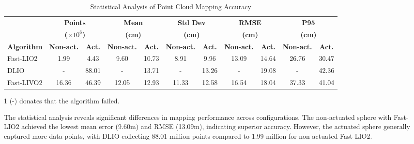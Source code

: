 \documentclass[conference]{IEEEtran}
\begin{document}
\begin{table}
\centering
\begin{threeparttable}
\caption{Statistical Analysis of Point Cloud Mapping Accuracy}
\label{tab:point_cloud_error}
\begin{tabular}{l|cc|cc|cc|cc|cc}
\toprule
& \multicolumn{2}{c|}{\textbf{Points}} & \multicolumn{2}{c|}{\textbf{Mean}} & \multicolumn{2}{c|}{\textbf{Std Dev}} & \multicolumn{2}{c|}{\textbf{RMSE}} & \multicolumn{2}{c}{\textbf{P95}} \\
& \multicolumn{2}{c|}{\textbf{($\times 10^6$)}} & \multicolumn{2}{c|}{\textbf{(cm)}} & \multicolumn{2}{c|}{\textbf{(cm)}} & \multicolumn{2}{c|}{\textbf{(cm)}} & \multicolumn{2}{c}{\textbf{(cm)}} \\
\cmidrule(r){2-3} \cmidrule(lr){4-5} \cmidrule(lr){6-7} \cmidrule(lr){8-9} \cmidrule(l){10-11}
\textbf{Algorithm} & \textbf{Non-act.} & \textbf{Act.} & \textbf{Non-act.} & \textbf{Act.} & \textbf{Non-act.} & \textbf{Act.} & \textbf{Non-act.} & \textbf{Act.} & \textbf{Non-act.} & \textbf{Act.} \\
\midrule
Fast-LIO2 & 1.99 & 4.43 & 9.60 & 10.73 & 8.91 & 9.96 & 13.09 & 14.64 & 26.76 & 30.47 \\
DLIO & - & 88.01 & - & 13.71 & - & 13.26 & - & 19.08 & - & 42.36 \\
Fast-LIVO2 & 16.36 & 46.39 & 12.05 & 12.93 & 11.33 & 12.58 & 16.54 & 18.04 & 37.33 & 41.04 \\
\bottomrule
\end{tabular}
\begin{tablenotes}
    \item[1] (-) donates that the algorithm failed. %
\end{tablenotes}
\end{threeparttable}
\end{table}

The statistical analysis reveals significant differences in mapping performance across configurations. 
The non-actuated sphere with Fast-LIO2 achieved the lowest mean error (9.60m) and RMSE (13.09m), indicating superior accuracy. 
However, the actuated sphere generally captured more data points, with DLIO collecting 88.01 million points compared to 1.99 million for non-actuated Fast-LIO2. 
\end{document}
